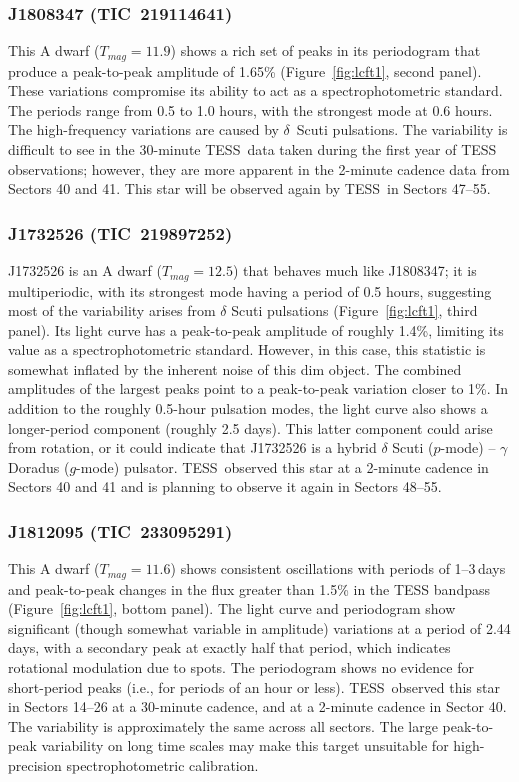 \documentclass[twocolumn, linenumbers]{aastex631}
\newcommand{\tess}{TESS}
\begin{document}
\vspace{2em}
\subsubsection{J1808347 (TIC~219114641)}

This A dwarf ($T_{mag}=11.9$) shows a rich set of peaks in its periodogram that produce a peak-to-peak amplitude of 1.65\% (Figure~\ref{fig:lcft1}, second panel). These variations compromise its ability to act as a spectrophotometric standard. The periods range from 0.5 to 1.0 hours, with the strongest mode at 0.6 hours.  The high-frequency variations are caused by $\delta$~Scuti pulsations.  The variability is difficult to see in the 30-minute \tess\ data taken during the first year of TESS observations; however, they are more apparent in the 2-minute cadence data from Sectors 40 and 41.  This star will be observed again by \tess\ in Sectors 47--55.  


\subsubsection{J1732526 (TIC~219897252)}

J1732526 is an A dwarf ($T_{mag}=12.5$) that behaves much like J1808347; it is multiperiodic, with its strongest mode having a period of 0.5 hours, suggesting most of the variability arises from $\delta$ Scuti pulsations (Figure~\ref{fig:lcft1}, third panel). Its light curve has a peak-to-peak amplitude of roughly 1.4\%, limiting its value as a spectrophotometric standard. However, in this case, this statistic is somewhat inflated by the inherent noise of this dim object. The combined amplitudes of the largest peaks point to a peak-to-peak variation closer to 1\%.  In addition to the roughly 0.5-hour pulsation modes, the light curve also shows a longer-period component (roughly 2.5 days). This latter component could arise from rotation, or it could indicate that J1732526 is a hybrid $\delta$ Scuti ($p$-mode) -- $\gamma$ Doradus ($g$-mode) pulsator. \tess\ observed this star at a 2-minute cadence in Sectors 40 and 41 and is planning to observe it again in Sectors 48--55.


\subsubsection{J1812095 (TIC~233095291)}

This A dwarf ($T_{mag}=11.6$) shows consistent oscillations with periods of 1--3\,days and peak-to-peak changes in the flux greater than 1.5\% in the TESS bandpass (Figure~\ref{fig:lcft1}, bottom panel).  The light curve and periodogram show significant (though somewhat variable in amplitude) variations at a period of 2.44 days, with a secondary peak at exactly half that period, which indicates rotational modulation due to spots.  The periodogram shows no evidence for short-period peaks (i.e., for periods of an hour or less).  \tess\ observed this star in Sectors 14--26 at a 30-minute cadence, and at a 2-minute cadence in Sector 40.  The variability is approximately the same across all sectors. The large peak-to-peak variability on long time scales may make this target unsuitable for high-precision spectrophotometric calibration.
\end{document}
